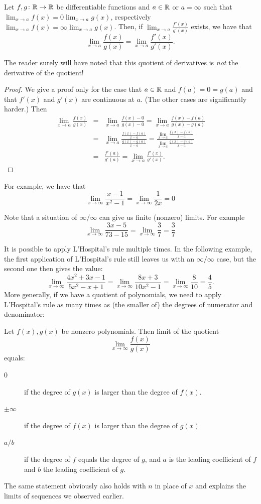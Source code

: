 \begin{thm}
Let $f,g\colon{\mathbb R}\to{\mathbb R}$ be differentiable functions and $a\in{\mathbb R}$ or
$a=\infty$ such that $\lim_{x\to a}f(x)=0\lim_{x\to a}g(x)$, respectively
$\lim_{x\to a}f(x)=\infty\lim_{x\to a}g(x)$. Then, if $\lim_{x\to
a}\frac{f'(x)}{g'(x)}$ exists, we have that
\[
\lim_{x\to a}\frac{f(x)}{g(x)}=\lim_{x\to a}\frac{f'(x)}{g'(x)}.
\]
\end{thm}
The reader surely will have noted that this quotient of derivatives is {\em
not} the derivative of the quotient!\\
\begin{proof}
We give a proof only for the case that $a\in{\mathbb R}$ and $f(a)=0=g(a)$ and that
$f'(x)$ and $g'(x)$ are continuous at $a$. (The other cases are
significantly harder.) Then
\begin{eqnarray*}
\lim_{x\to a}\frac{f(x)}{g(x)}
&=&\lim_{x\to a}\frac{f(x)-0}{g(x)-0}
=\lim_{x\to a}\frac{f(x)-f(a)}{g(x)-g(a)}\\
&=&\lim_{x\to a}\frac{\frac{f(x)-f(a)}{x-a}}{\frac{g(x)-g(a)}{x-a}}
=
\frac{\lim_{x\to a}\frac{f(x)-f(a)}{x-a}}{\lim_{x\to
a}\frac{g(x)-g(a)}{x-a}}\\
&=&\frac{f'(a)}{g'(a)}=\lim_{x\to a}\frac{f'(x)}{g'(x)}.
\end{eqnarray*}
\end{proof}

For example, we have that
\[
\lim_{x\to\infty}\frac{x-1}{x^2-1}=
\lim_{x\to\infty}\frac{1}{2x}=0
\]

Note that a situation of $\infty/\infty$ can give us finite (nonzero)
limits. For example
\[
\lim_{x\to\infty}\frac{3x-5}{73-15}=
\lim_{x\to\infty}\frac{3}{7}=\frac{3}{7}
\]

It is possible to apply L'Hospital's rule multiple times. In the following
example, the first application of L'Hospital's rule still leaves us with an
$\infty/\infty$ case, but the second one then gives the value:
\[
\lim_{x\to\infty}\frac{4x^2+3x-1}{5x^2-x+1}
=\lim_{x\to\infty}\frac{8x+3}{10x^2-1}
=\lim_{x\to\infty}\frac{8}{10}=\frac{4}{5}.
\]
More generally, if we have a quotient of polynomials, we need to apply 
L'Hospital's rule as many times as (the smaller of) the degrees of numerator
and denominator:
\begin{thm}
Let $f(x),g(x)$ be nonzero polynomials. Then limit of the quotient
\[
\lim_{x\to\infty}\frac{f(x)}{g(x)}
\]
equals:
\begin{description}
\item[$0$] if the degree of $g(x)$ is larger than the degree of $f(x)$.\\
\item[$\pm\infty$] if the degree of $f(x)$ is larger than the degree of
$g(x)$\\
\item[$a/b$] if the degree of $f$ equals the degree of $g$, and $a$ is the
leading coefficient of $f$ and $b$ the leading coefficient of $g$.
\end{description}
\end{thm}
The same statement obviously also holds with $n$ in place of $x$ and
explains the limits of sequences we observed earlier.

